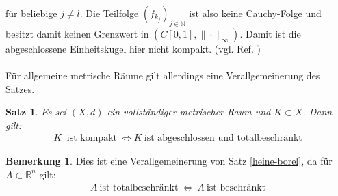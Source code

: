 \documentclass[10pt,a4paper]{article}
\theoremstyle{plain}
\newtheorem{satz}{Satz}[section]
\newenvironment{sa}{\begin{shaded}\begin{satz}}{\end{satz}\end{shaded}}
\theoremstyle{definition}
\theoremstyle{nonumberplain}
\newtheorem{bemerkung}{Bemerkung}
\newenvironment{bem}{\begin{bemerkung}}{\end{bemerkung}}
\newcommand{\N}{\mathbb{N}}
\newcommand{\R}{\mathbb{R}}
\begin{document}
für beliebige $j \neq l$. Die Teilfolge ${(f_{k_j})}_{j \in \N}$ ist also keine Cauchy-Folge und besitzt damit keinen Grenzwert in $(C[0,1], \|\cdot\|_\infty)$. Damit ist die abgeschlossene Einheitskugel hier nicht kompakt. (vgl. Ref. \cite{uni})\\\\
Für allgemeine metrische Räume gilt allerdings eine Verallgemeinerung des Satzes.
\begin{sa}
Es sei $(X,d)$ ein vollständiger metrischer Raum und $K \subset X$. Dann gilt:
\begin{align*}
K \: \text{ ist kompakt} \: \Leftrightarrow K \: \text{ist abgeschlossen und totalbeschränkt}
\end{align*}
\end{sa}
\begin{bem}
Dies ist eine Verallgemeinerung von Satz \hyperref[heine-borel]{\ref*{heine-borel}}, da für $A \subset \R^n$ gilt:
\begin{align*}
 A \: \text{ist totalbeschränkt} \: \Leftrightarrow \: A \: \text{ist beschränkt}
\end{align*}
\end{bem}
\newpage

\pagestyle{plain}
\section*{}
\printbibliography[title=Abbildungsverzeichnis, type=misc]

\section*{}
\printbibliography[title=Internetquellen, nottype=book, nottype=misc]

\section*{}
\printbibliography[title=Literatur, type=book]
\end{document}

